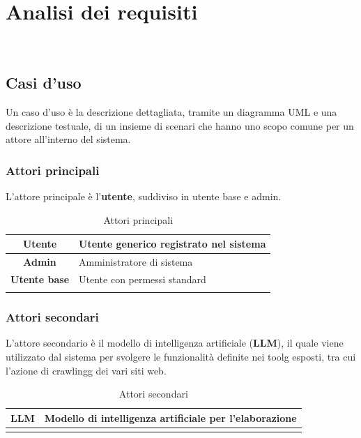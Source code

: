 \chapter{Analisi dei requisiti}
\label{cap:analisi-requisiti}

\\

\section{Casi d'uso}

Un caso d'uso è la descrizione dettagliata, tramite un diagramma UML e una descrizione testuale, di un insieme di scenari che hanno uno scopo comune per un attore all'interno del sistema.


\subsection{Attori principali}
L'attore principale è l'\textbf{utente}, suddiviso in utente base e admin.
\begingroup
\renewcommand{\arraystretch}{1.5}
\begin{center}
\begin{xltabular}{\textwidth}{|c|X|}
\hline
\textbf{Utente} & Utente generico registrato nel sistema \\
\hline
\textbf{Admin} & Amministratore di sistema \\
\hline
\textbf{Utente base} & Utente con permessi standard \\
\hline
\caption{Attori principali}
\end{xltabular}
\end{center}
\endgroup

\subsection{Attori secondari}
L'attore secondario è il modello di intelligenza artificiale (\textbf{LLM}), il quale viene utilizzato dal sistema per 
svolgere le funzionalità definite nei \gls{toolg} esposti, tra cui l'azione di \gls{crawlingg} dei vari siti web.
\begingroup
\renewcommand{\arraystretch}{1.5}
\begin{center}
\begin{xltabular}{\textwidth}{|c|X|}
\hline
\textbf{LLM} & Modello di intelligenza artificiale per l'elaborazione \\
\hline
\caption{Attori secondari}
\end{xltabular}
\end{center}
\endgroup

